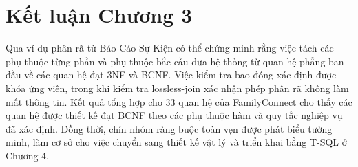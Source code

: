 \section*{Kết luận Chương 3}

Qua ví dụ phân rã từ Báo Cáo Sự Kiện có thể chứng minh rằng việc tách các phụ thuộc từng phần và phụ thuộc bắc cầu đưa hệ thống từ quan hệ phẳng ban đầu về các quan hệ đạt 3NF và BCNF. Việc kiểm tra bao đóng xác định được khóa ứng viên, trong khi kiểm tra lossless-join xác nhận phép phân rã không làm mất thông tin. Kết quả tổng hợp cho 33 quan hệ của FamilyConnect cho thấy các quan hệ được thiết kế đạt BCNF theo các phụ thuộc hàm và quy tắc nghiệp vụ đã xác định. Đồng thời, chín nhóm ràng buộc toàn vẹn được phát biểu tường minh, làm cơ sở cho việc chuyển sang thiết kế vật lý và triển khai bằng T-SQL ở Chương 4.
